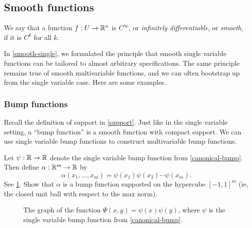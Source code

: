 
\subsection{Smooth functions}

\begin{definition}[Smoothness] \label{smooth-multi} 
	We say that a function $f : U \to \mathbb{R}^n$ is $C^\infty$, or \emph{infinitely differentiable}, or \emph{smooth}, if it is $C^k$ for all $k$. 
\end{definition}

In \cref{smooth-single}, we formulated the principle that smooth single variable functions can be tailored to almost arbitrary specifications. The same principle remains true of smooth multivariable functions, and we can often bootstrap up from the single variable case. Here are some examples. 

\subsubsection*{Bump functions}

Recall the definition of support in \cref{support}. Just like in the single variable setting, a ``bump function'' is a smooth function with compact support. We can use single variable bump functions to construct multivariable bump functions. 

\begin{exercise} \label{multivariable-bump-square-support}
	Let $\psi : \mathbb{R} \to \mathbb{R}$ denote the single variable bump function from \cref{canonical-bump}. Then define $\alpha : \mathbb{R}^m \to \mathbb{R}$ by
	\[ \alpha(x_1, \dotsc, x_m) = \psi(x_1) \psi(x_2) \dotsb \psi(x_m). \]
	See \cref{multivariable-bump-square-support-graph}. Show that $\alpha$ is a bump function supported on the hypercube $[-1,1]^m$ (ie, the closed unit ball with respect to the max norm). 
	\begin{figure}[ht]
		\begin{center}
		\end{center}
		\caption{The graph of the function  $\Psi(x,y) = \psi(x)\psi(y)$, where $\psi$ is the single variable bump function from \cref{canonical-bump}.} \label{multivariable-bump-square-support-graph}
	\end{figure}
\end{exercise}

